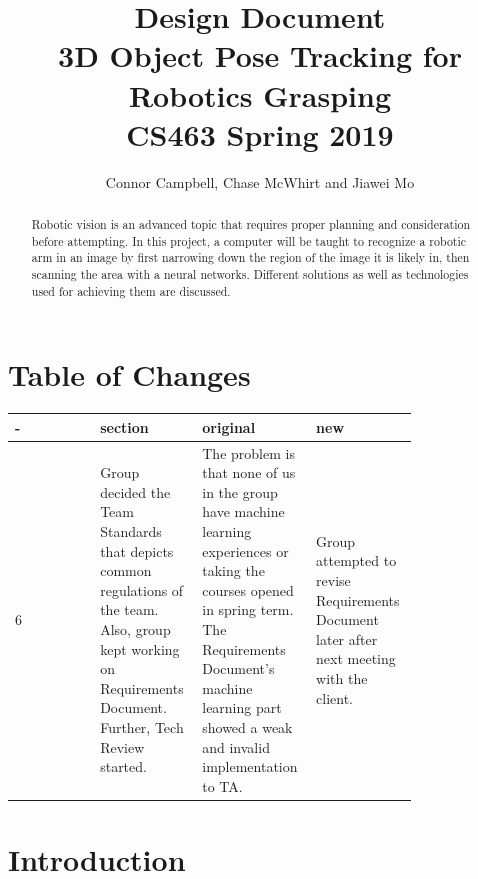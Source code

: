 \documentclass[10pt,journal,compsoc, draftclsnofoot,onecolumn]{IEEEtran}
\begin{document}
\title{
Design Document\\
3D Object Pose Tracking for Robotics Grasping\\
CS463 Spring 2019
}
\author{Connor Campbell, Chase McWhirt and Jiawei Mo}

\maketitle

\begin{abstract}
Robotic vision is an advanced topic that requires proper planning and consideration before attempting. In this project, a computer will be taught to recognize a robotic arm in an image by first narrowing down the region of the image it is likely in, then scanning the area with a neural networks. Different solutions as well as technologies used for achieving them are discussed.
\end{abstract}

\IEEEdisplaynontitleabstractindextext
\IEEEpeerreviewmaketitle

\pagebreak
\tableofcontents
\section{Table of Changes}
\begin{center}
 \begin{tabular}{|p{0.2\linewidth}|p{0.2\linewidth}|p{0.2\linewidth}|p{0.2\linewidth}|}
  \hline
 - & section & original & new \\ [0.5ex]
 \hline\hline

6
&
Group decided the Team Standards that depicts common regulations of the team.
Also, group kept working on Requirements Document.
Further, Tech Review started. 
&
The problem is that none of us in the group have machine learning experiences or taking the courses opened in spring term.
The Requirements Document's machine learning part showed a weak and invalid implementation to TA.
&
Group attempted to revise Requirements Document later after next meeting with the client.
\\ \hline

 
 
 \end{tabular}
\end{center}
\pagebreak

\section{Introduction}
\end{document}
